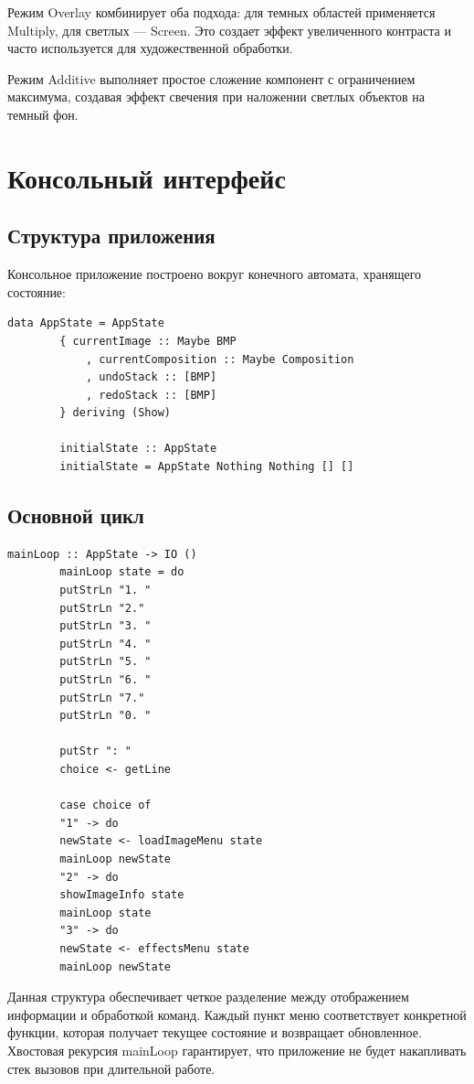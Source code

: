 \documentclass[a4paper,12pt]{article}
\begin{document}
	Режим Overlay комбинирует оба подхода: для темных областей применяется Multiply, для светлых — Screen. Это создает эффект увеличенного контраста и часто используется для художественной обработки.
	
	Режим Additive выполняет простое сложение компонент с ограничением максимума, создавая эффект свечения при наложении светлых объектов на темный фон.
	
	\newpage
	\section{Консольный интерфейс}
	
	\subsection{Структура приложения}
	
	Консольное приложение построено вокруг конечного автомата, хранящего состояние:
	
	\begin{lstlisting}[caption=Состояние приложения, label=lst:app-state]
		data AppState = AppState
		{ currentImage :: Maybe BMP      
			, currentComposition :: Maybe Composition  
			, undoStack :: [BMP]              
			, redoStack :: [BMP]        
		} deriving (Show)
		
		initialState :: AppState
		initialState = AppState Nothing Nothing [] []
	\end{lstlisting}
	
	\subsection{Основной цикл}
	
	\begin{lstlisting}[caption=Главный цикл приложения, label=lst:main-loop]
		mainLoop :: AppState -> IO ()
		mainLoop state = do
		putStrLn "1. "
		putStrLn "2."
		putStrLn "3. "
		putStrLn "4. "
		putStrLn "5. "
		putStrLn "6. "
		putStrLn "7."
		putStrLn "0. "
		
		putStr ": "
		choice <- getLine
		
		case choice of
		"1" -> do
		newState <- loadImageMenu state
		mainLoop newState
		"2" -> do
		showImageInfo state
		mainLoop state
		"3" -> do
		newState <- effectsMenu state
		mainLoop newState

	\end{lstlisting}
	
	Данная структура обеспечивает четкое разделение между отображением информации и обработкой команд. Каждый пункт меню соответствует конкретной функции, которая получает текущее состояние и возвращает обновленное. Хвостовая рекурсия mainLoop гарантирует, что приложение не будет накапливать стек вызовов при длительной работе.
	
\end{document}
